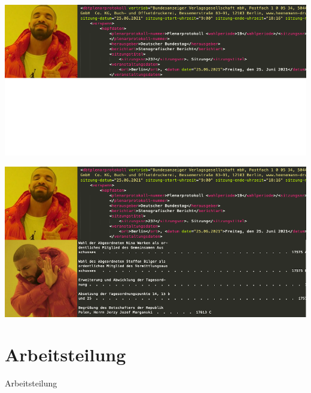 \documentclass{beamer}
\begin{document}
\begin{frame}[allowframebreaks]
    \hspace*{-10.75mm}
    \includegraphics[width=\paperwidth]{drakememe-only-19}

    \break

    \hspace*{-10.75mm}
    \includegraphics[width=\paperwidth]{drakememe}
\end{frame}

\section{Arbeitsteilung}
\begin{frame}
  \begin{center}
    {\Huge Arbeitsteilung}
  \end{center}
\end{frame}
\end{document}
